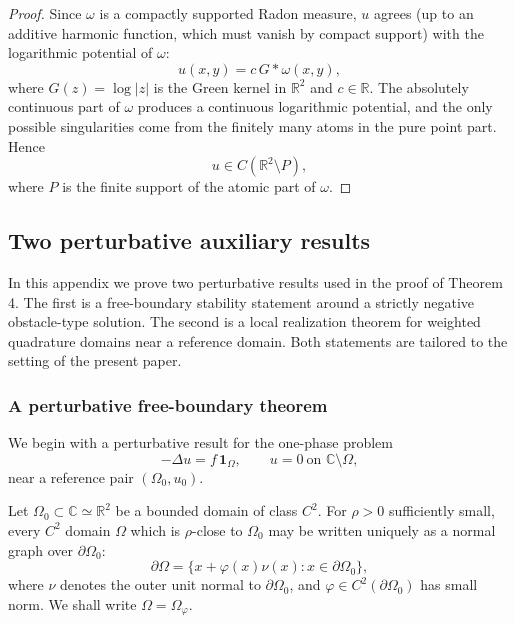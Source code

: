 \documentclass[a4paper,11pt,reqno]{amsart}
\numberwithin{equation}{section}
\theoremstyle{plain} %
\theoremstyle{definition} %
\theoremstyle{remark}
\newcommand{\R}{\mathbb{R}}
\newcommand{\C}{\mathbb{C}}
\begin{document}
\begin{proof}
Since $\omega$ is a compactly supported Radon measure, $u$ agrees (up to an additive harmonic function, which must vanish by compact support) with the logarithmic potential of $\omega$:
\[
u(x,y)=c\, G*\omega(x,y),
\]
where $G(z)=\log|z|$ is the Green kernel in $\R^2$ and $c\in\R$. The absolutely continuous part of $\omega$ produces a continuous logarithmic potential, and the only possible singularities come from the finitely many atoms in the pure point part. Hence
\[
u\in C(\R^2\setminus P),
\]
where $P$ is the finite support of the atomic part of $\omega$.
\end{proof}

\subsection{Two perturbative auxiliary results}\label{app:auxiliary-results}

In this appendix we prove two perturbative results used in the proof of
Theorem 4. The first is a free-boundary stability
statement around a strictly negative obstacle-type solution. The second is a
local realization theorem for weighted quadrature domains near a reference
domain. Both statements are tailored to the setting of the present paper.

\subsubsection{A perturbative free-boundary theorem}\label{app:isakov-type}

We begin with a perturbative result for the one-phase problem
\[
-\Delta u = f\,\mathbf{1}_{\Omega},
\qquad
u=0 \ \text{on } \C\setminus \Omega,
\]
near a reference pair \((\Omega_0,u_0)\).

Let \(\Omega_0\subset \C\simeq \R^2\) be a bounded domain of class \(C^2\). For
\(\rho>0\) sufficiently small, every \(C^2\) domain \(\Omega\) which is
\(\rho\)-close to \(\Omega_0\) may be written uniquely as a normal graph over
\(\partial\Omega_0\):
\[
\partial\Omega
=
\{x+\varphi(x)\nu(x):x\in \partial\Omega_0\},
\]
where \(\nu\) denotes the outer unit normal to \(\partial\Omega_0\), and
\(\varphi\in C^2(\partial\Omega_0)\) has small norm. We shall write
\(\Omega=\Omega_\varphi\).
\end{document}
